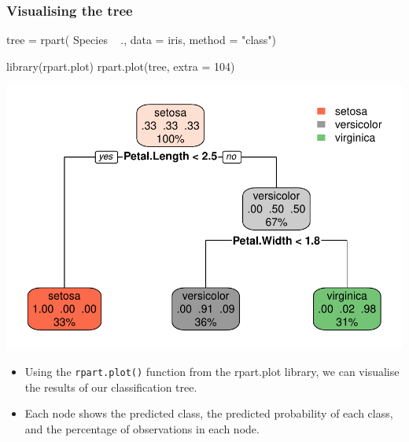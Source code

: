 \documentclass[a4paper]{article}
\begin{document}
\subsubsection{Visualising the tree}
\begin{Schunk}
\begin{Sinput}
tree = rpart(
  Species ~ .,
  data = iris,
  method = "class") 

library(rpart.plot)
rpart.plot(tree, extra = 104)
\end{Sinput}


{\centering \includegraphics[width=\maxwidth]{figure/listings-unnamed-chunk-428-1} 

}

\end{Schunk}
\begin{itemize}
	\item Using the \lstinline|rpart.plot()| function from the rpart.plot library, we can visualise the results of our classification tree.
	\item Each node shows the predicted class, the predicted probability of each class, and the percentage of observations in each node.
\end{itemize}
\end{document}
